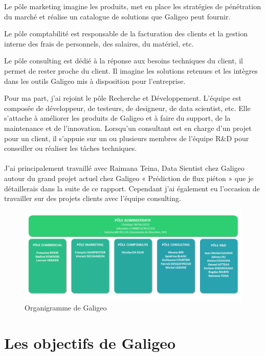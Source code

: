Le pôle marketing imagine les produits, met en place les stratégies de pénétration du marché et réalise un catalogue de solutions que Galigeo peut fournir.

Le pôle comptabilité est responsable de la facturation des clients et la gestion interne des frais de personnels, des salaires, du matériel, etc.

Le pôle consulting est dédié à la réponse aux besoins techniques du client, il permet de rester proche du client. Il imagine les solutions retenues et les intègres dans les outils Galigeo mis à disposition pour l’entreprise.


Pour ma part, j’ai rejoint le pôle Recherche et Développement. L’équipe est composée de développeur, de testeurs, de designeur, de data scientist, etc. Elle s’attache à améliorer les produits de Galigeo et à faire du support, de la maintenance et de l’innovation. Lorsqu’un consultant est en charge d’un projet pour un client, il s’appuie sur un ou plusieurs membres de l’équipe R\&D pour conseiller ou réaliser les tâches techniques.

\paragraph*{}

J’ai principalement travaillé avec Raimana Teina, Data Sientist chez Galigeo autour du grand projet actuel chez Galigeo « Prédiction de flux piéton » que je détaillerais dans la suite de ce rapport. Cependant j’ai également eu l’occasion de travailler sur des projets clients avec l’équipe consulting. 

\begin{figure}[H]
    \centering
    \includegraphics[width=\linewidth]{images/graphs/organigramme.png}
    \caption{Organigramme de Galigeo}
    \label{fig:organigrame}
\end{figure}


\section{Les objectifs de Galigeo}

